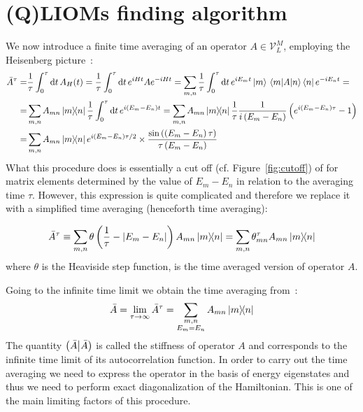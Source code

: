\section{(Q)LIOMs finding algorithm\label{sec:algorithm}}
We now introduce a finite time averaging of an operator \(A\in \mathcal{V}_L^M\), employing the Heisenberg picture~\autocite{Mierzejewski2015Approx}:
\begin{align}
  \bar{A}^{\tau} = & \frac{1}{\tau} \int_0^{\tau} \mathrm{d}t\, A_{H}(t) = \frac{1}{\tau} \int_0^{\tau} \mathrm{d}t\, e^{i H t}A e^{-i H t}
  =\sum_{m,n} \frac{1}{\tau} \int_0^{\tau} \mathrm{d}t\, e^{i E_m t}\ket{m} \matrixel{m}{A}{n}\bra{n}  e^{-i E_n t} = \nonumber{}           \\
  =                & \sum_{m,n} A_{mn}\ketbra{m}{n} \frac{1}{\tau} \int_0^{\tau} \mathrm{d}t \, e^{i(E_m-E_n)t} =
  \sum_{m,n} A_{mn}\ketbra{m}{n} \frac{1}{\tau} \frac{1}{i\left(E_m-E_n\right)}\left(e^{i\left(E_m-E_n\right)\tau}-1\right) \nonumber       \\
  =                & \sum_{m,n} A_{mn}\ketbra{m}{n}
  e^{i\left(E_m-E_n\right)\tau/2}\times \frac{\sin{\left(\left(E_m-E_n\right)\tau\right)}}{\tau\left(E_m-E_n\right)}
  \label{eq:time_avg}
\end{align}
What this procedure does is essentially a cut off (cf. Figure~\ref{fig:cutoff}) of for matrix elements determined by the value of \(E_m-E_n\) in relation
to the averaging time \(\tau{}\). However, this expression is quite complicated and therefore we replace it with a simplified time
averaging (henceforth time averaging):
\begin{definition}
  \begin{equation}
    \bar{A}^{\tau} \equiv \sum_{m,n} \theta\left(\frac{1}{\tau} - \abs{E_m-E_n}\right) A_{mn} \ketbra{m}{n}
    = \sum_{m,n} \theta_{mn}^{\tau} A_{mn} \ketbra{m}{n}
    \label{def:simple time avg}
  \end{equation}
  where \(\theta{}\) is the Heaviside step function, is the time averaged version of operator \(A\).
\end{definition}
Going to the infinite time limit we obtain the time averaging
from~\textcite{Mierzejewski2015a}:
\begin{equation}
  \bar{A} = \lim_{\tau \to \infty} \bar{A}^{\tau} = \sum_{ \substack{m,n\\E_m=E_n} } A_{mn} \ketbra{m}{n}
  \label{eq:inf time avg}
\end{equation}
The quantity \(\left(\bar{A} \middle| \bar{A}\right)\) is called the stiffness of operator \(A\) and corresponds to the infinite time limit
of its autocorrelation function. In order to carry out the time averaging we need to express the operator
in the basis of energy eigenstates and thus we need to perform exact diagonalization of the Hamiltonian.
This is one of the main limiting factors of this procedure.

